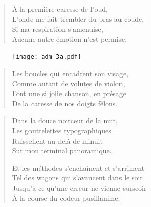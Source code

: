 \begin{verse}\quatrain
  À la première caresse de l’oud,\\  %
  L’onde me fait trembler du bras au coude.\\   %
  Si ma respiration s’amenuise,\\   %
  Aucune autre émotion n’est permise. 
\end{verse}

\begin{figure}[h]
  \centering
  \texttt{[image: adm-3a.pdf]}
  \captionsetup{labelformat=empty}
  \caption[Terminal ADM-3A]{}
\end{figure}




\begin{verse}\quatrain
  Les boucles qui encadrent son visage,\\  %
  Comme autant de volutes de violon,\\  %
  Font une si jolie chanson, en présage\\  %
  De la caresse de nos doigts fêlons.
\end{verse}

\begin{verse}\quatrain
  Dans la douce noirceur de la nuit,\\  %
  Les gouttelettes typographiques\\  %
  Ruissellent au delà de minuit\\  %
  Sur mon terminal panoramique.

  Et les méthodes%
  s’enchaînent et s’arriment\\  %
  Tel des wagons qui s’avancent dans le soir\\  %
  Jusqu’à ce qu’une erreur ne vienne surseoir\\  %
  À la course du codeur pusillanime.
\end{verse}

